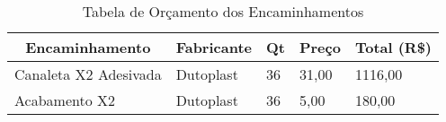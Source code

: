 \begin{table}[h!]
	\centering
	\begin{tabular}{|l|l|l|l|l|}
		\hline
		\multicolumn{1}{|c|}{\textbf{Encaminhamento}} & \multicolumn{1}{c|}{\textbf{Fabricante}} & \multicolumn{1}{c|}{\textbf{Qt}} & \textbf{Preço} & \textbf{Total (R\$)} \\ \hline
		Canaleta X2 Adesivada                         & Dutoplast                                & 36                               & 31,00          & 1116,00              \\ \hline
		Acabamento X2                                 & Dutoplast                                & 36                               & 5,00           & 180,00               \\ \hline
	\end{tabular}
	\caption{Tabela de Orçamento dos Encaminhamentos}
	\label{tab:orcEncaminhamentos}
\end{table}
